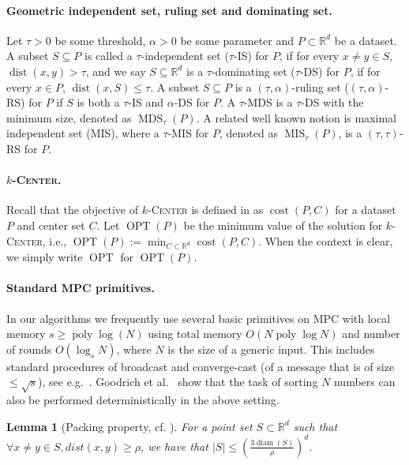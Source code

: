 \documentclass[11pt,letterpaper]{article}
\theoremstyle{plain}
\newtheorem{lemma}[theorem]{Lemma}
\theoremstyle{definition}
\theoremstyle{remark}
\newcommand{\ProblemName}[1]{\textsc{#1}}
\newcommand{\kCenter}{$k$-\ProblemName{Center}\xspace}
\DeclareMathOperator{\poly}{poly}
\DeclareMathOperator{\cost}{cost}
\DeclareMathOperator{\OPT}{OPT}
\DeclareMathOperator{\dist}{dist}
\DeclareMathOperator{\diam}{diam}
\DeclareMathOperator{\MIS}{MIS}
\DeclareMathOperator{\MDS}{MDS}
\begin{document}
\paragraph{Geometric independent set, ruling set and dominating set.} 
Let $\tau>0$ be some threshold, $\alpha>0$ be some parameter and $P\subset \mathbb{R}^{d}$ be a dataset. 
A subset $S\subseteq P$ is called a $\tau$-independent set ($\tau$-IS) for $P$, if for every $x\neq y\in S$, $\dist(x, y)>\tau$, 
and we say $S \subseteq \mathbb{R}^d$ is a $\tau$-dominating set ($\tau$-DS) for $P$,
if for every $x \in P$, $\dist(x, S) \leq \tau$. 
A subset $S \subseteq P$ is a $(\tau, \alpha)$-ruling set ($(\tau, \alpha)$-RS) for $P$ if $S$ is both a $\tau$-IS and $\alpha$-DS for $P$. 
A $\tau$-MDS is a $\tau$-DS with the minimum size, denoted as $\MDS_\tau(P)$. 
A related well known notion is maximal independent set (MIS), where a $\tau$-MIS for $P$, denoted as $\MIS_{\tau}(P)$, is a $(\tau, \tau)$-RS for $P$. 




\paragraph{\kCenter.}
Recall that the objective of \kCenter is defined in  as $\cost(P, C)$ for a dataset $P$ and center set $C$.
Let $\OPT(P)$ be the minimum value of the solution for \kCenter, i.e., $\OPT(P):= \min_{C\subset \mathbb{R}^{d}} \cost(P, C)$. When the context is clear, we simply write $\OPT$ for $\OPT(P)$.










\paragraph{Standard MPC primitives.}


In our algorithms we frequently use several basic primitives on MPC with local memory $s \geq \poly\log(N)$ using total memory $O(N \poly\log N)$ and number of rounds $O(\log_s N)$, where $N$ is the size of a generic input.
This includes standard procedures of broadcast and converge-cast (of a message that is of size $\leq \sqrt s$), see e.g.~\cite{mpc_book}.
Goodrich et al.~\cite{GSZ11} show that the task of sorting $N$ numbers can also be performed deterministically in the above setting. 

\begin{lemma}[Packing property, cf. {\cite[Lemma 4.1]{pollard1990empirical}}]
    \label{lemma:packing}
    For a point set $S\subset \mathbb{R}^{d}$ such that $\forall x \neq y \in S, dist(x, y) \geq \rho$, we have that $|S|\leq (\frac{3\diam(S)}{\rho})^{d}$.  
\end{lemma}
\end{document}
